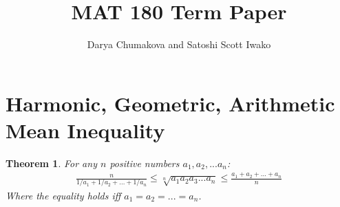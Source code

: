 \documentclass[12pt]{extreport}
\newtheorem*{thm}{Theorem}
\begin{document}
\title{MAT 180 Term Paper}
\author{Darya Chumakova and Satoshi Scott Iwako}
\maketitle


\section*{Harmonic, Geometric, Arithmetic Mean Inequality}
\begin{thm}
For any $n$ positive numbers $a_1, a_2, ... a_n$: 
\begin{align*}
\frac{n}{1/a_1 + 1/a_2 + ... + 1/a_n} \leq \sqrt[n]{a_1 a_2 a_3 ... a_n} \leq \frac{a_1 + a_2 + ... + a_n}{n}
\end{align*}
Where the equality holds iff $a_1 = a_2 = ... = a_n$.
\end{thm}
\end{document}
